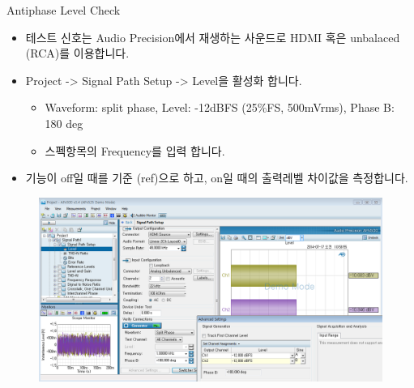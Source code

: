 \documentclass{beamer}
\begin{document}
\begin{frame}[t]{Antiphase Level Check}
\begin{itemize}
\item 테스트 신호는 Audio Precision에서 재생하는 사운드로 HDMI 혹은 unbalaced (RCA)를 이용합니다.
\item Project -> Signal Path Setup -> Level을 활성화 합니다.
	\begin{itemize}
	\item Waveform: split phase, Level: -12dBFS (25\%FS, 500mVrms), Phase B: 180 deg
	\item 스펙항목의 Frequency를 입력 합니다.
	\end{itemize}
\item 기능이 off일 때를 기준 (ref)으로 하고, on일 때의 출력레벨 차이값을 측정합니다.
\end{itemize}

\begin{figure}[r]
\includegraphics[height=0.4\textwidth]{figure/apsetting/antiphaseLevel.png}
\end{figure}
\end{frame}
\end{document}
